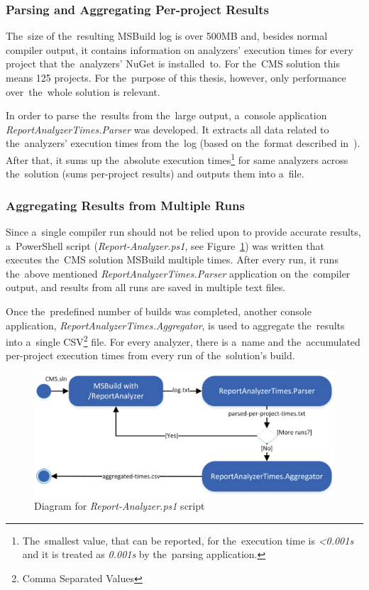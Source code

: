 \documentclass[
  digital, %
  table,   %
  lof,     %
  lot,     %
  oneside,
]{fithesis3}
\begin{document}
\subsubsection{\textbf{Parsing and Aggregating Per-project Results}}
The~size of the~resulting MSBuild log is over 500MB and, besides normal compiler output, it contains information on analyzers' execution times for every project that the~analyzers' NuGet is installed~to. For the~CMS solution this means 125 projects. For the~purpose of this thesis, however, only performance over~the~whole solution is relevant. 

In order to parse the~results from the~large output, a~console application \textit{ReportAnalyzerTimes.Parser} was developed. It extracts all data related to the~analyzers' execution times from the~log (based on the~format described in~\cite{report-analyzer}). After that, it sums up the~absolute execution times\footnote{The~smallest value, that can be reported, for the~execution time is \textit{<0.001s} and it is treated as \textit{0.001s} by the~parsing application.} for same analyzers across the~solution (sums per-project results) and outputs them into a~file.

\subsubsection{\textbf{Aggregating Results from Multiple Runs}}
Since a~single compiler run should not be relied upon to provide accurate results, a~PowerShell script (\textit{Report-Analyzer.ps1}, see Figure~\ref{fig:uml-report-analyzer-dfd}) was written that executes the~CMS solution MSBuild multiple times. After every run, it runs the~above mentioned \textit{ReportAnalyzerTimes.Parser} application on the~compiler output, and results from all runs are saved in multiple text files. 

Once the~predefined number of builds was completed, another console application, \textit{ReportAnalyzerTimes.Aggregator}, is used to aggregate the~results into a~single CSV\footnote{Comma Separated Values} file. For every analyzer, there is a~name and the~accumulated per-project execution times from every run of the~solution's build.

\begin{figure}[h!]
		\centering
			\includegraphics[scale=0.98]{img/uml/report-analyzer-flow}
		\caption{Diagram for \textit{Report-Analyzer.ps1} script}
		\label{fig:uml-report-analyzer-dfd}
\end{figure}
\end{document}

